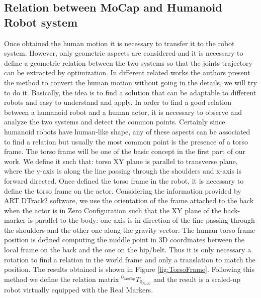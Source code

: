 \documentclass[a4paper, 10pt, conference]{ieeeconf}
\begin{document}
\subsection{Relation between MoCap and Humanoid Robot system}
Once obtained the human motion it is necessary to transfer it to the robot system. However, only geometric aspects are considered and it is necessary to define a geometric relation between the two systems so that the joints trajectory can be extracted by optimization.
In different related works the authors present the method to convert the human motion without going in the details, we will try to do it.
Basically, the idea is to find a solution that can be adaptable to different robots and easy to understand and apply.
In order to find a good relation between a humanoid robot and a human actor, it is necessary to observe and analyze the two systems and detect the common points.
Certainly since humanoid robots have human-like shape, any of these aspects can be associated to find a relation but usually the most common point is the presence of a torso frame.
The torso frame will be one of the basic concept in the first part of our work. We define it such that: torso XY plane is parallel to transverse plane, where the y-axis is along the line passing through the shoulders and x-axis is forward directed. 
Once defined the torso frame in the robot, it is necessary to define the torso frame on the actor. Considering the information provided by ART DTrack2 software, we use the orientation of the frame attached to the back when the actor is in Zero Configuration such that the XY plane of the back-marker is parallel to the body: one axis is in direction of the line passing through the shoulders and the other one along the gravity vector.
The human torso frame position is defined computing the middle point in 3D coordinates between the local frame on the back and the one on the hip/belt.
Thus it is only necessary a rotation to find a relation in the world frame and only a translation to match the position.
The results obtained is shown in Figure \ref{fig:TorsoFrame}.
Following this method we define the relation matrix $^{0_{MoCap}}T_{0_{NAO}}$ and the result is a scaled-up robot virtually equipped with the Real Markers.
\end{document}
